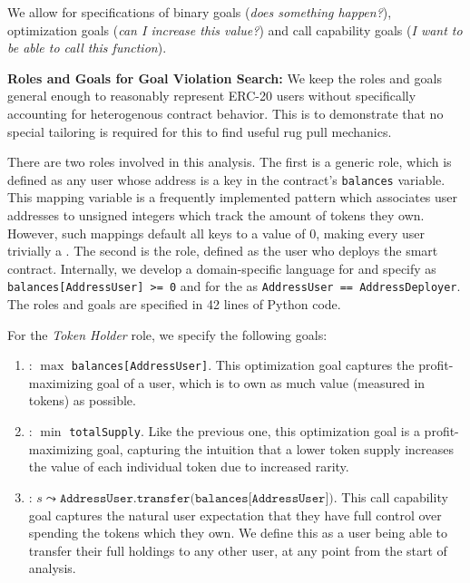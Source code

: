 We allow for specifications of binary goals (\textit{does something happen?}), optimization goals (\textit{can I increase this value?}) and call capability goals (\textit{I want to be able to call this function}).


\smallskip
\noindent


\textbf{Roles and Goals for Goal Violation Search:}
We keep the roles and goals general enough to reasonably represent ERC-20 users without specifically accounting for heterogenous contract behavior.
This is to demonstrate that no special tailoring is required for this to find useful rug pull mechanics.

There are two roles involved in this analysis.
The first is a generic \holder role, which is defined as any user whose address is a key in the contract's \texttt{balances} variable.
This mapping variable is a frequently implemented pattern which associates user addresses to unsigned integers which track the amount of tokens they own.
However, such mappings default all keys to a value of $0$, making every user trivially a \holder.
The second is the \owner role, defined as the user who deploys the smart contract.
Internally, we develop a domain-specific language for \spoilsport and specify \holder as \texttt{balances[AddressUser] >= 0} and for the \owner as \texttt{AddressUser == AddressDeployer}.
The roles and goals are specified in 42 lines of Python code.

For the \textit{Token Holder} role, we specify the following goals:
\begin{enumerate}
    \item \textit{\rev{\maxowned}}: $\max$ \texttt{balances[AddressUser]}.
        This optimization goal captures the profit-maximizing goal of a user, which is to own as much value (measured in tokens) as possible.
    \item \textit{\rev{\minsupply}}: $\min$ \texttt{totalSupply}.
        Like the previous one, this optimization goal is  a profit-maximizing goal, capturing the intuition that a lower token supply increases the value of each individual token due to increased rarity.
    \item \textit{\liquidity}: $s \leadsto\texttt{AddressUser.transfer(balances[AddressUser])}$.
        This call capability goal captures the natural user expectation that they have full control over spending the tokens which they own.
        We define this as a user being able to transfer their full holdings to any other user, at any point from the start of analysis.
\end{enumerate}

